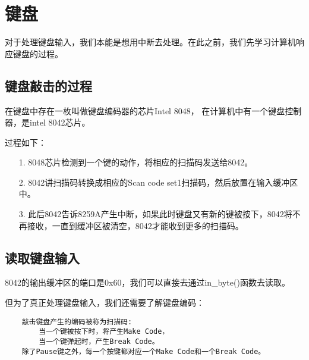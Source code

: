 \documentclass[a4paper,left=2.5cm,right=2.5cm,11pt]{article}
\begin{document}
\tableofcontents

\clearpage

\section{键盘}
	对于处理键盘输入，我们本能是想用中断去处理。在此之前，我们先学习计算机响应键盘的过程。\par

\subsection{键盘敲击的过程}
	在键盘中存在一枚叫做键盘编码器的芯片Intel 8048，
	在计算机中有一个键盘控制器，是intel 8042芯片。\par

	过程如下：
	\begin{itemize}
		\item[1.] 8048芯片检测到一个键的动作，将相应的扫描码发送给8042。
		\item[2.] 8042讲扫描码转换成相应的Scan code set1扫描码，然后放置在输入缓冲区中。
		\item[3.] 此后8042告诉8259A产生中断，如果此时键盘又有新的键被按下，8042将不再接收，一直到缓冲区被清空，8042才能收到更多的扫描码。
	\end{itemize}

\subsection{读取键盘输入}
	8042的输出缓冲区的端口是0x60，我们可以直接去通过in\_byte()函数去读取。\par

	但为了真正处理键盘输入，我们还需要了解键盘编码：
	\begin{lstlisting}
	敲击键盘产生的编码被称为扫描码:
		当一个键被按下时，将产生Make Code，
		当一个键弹起时，产生Break Code。
	除了Pause键之外，每一个按键都对应一个Make Code和一个Break Code。
	\end{lstlisting}
\end{document}
